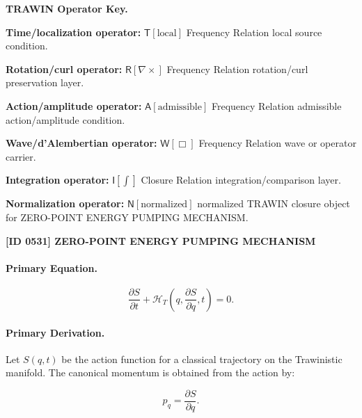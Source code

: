 \par\vspace{0.45\baselineskip}
\noindent\begin{minipage}[t]{\linewidth}
\begingroup
\small
\raggedright
\textbf{TRAWIN Operator Key.}\par
\noindent\textbf{Time/localization operator:} $\mathsf{T}\!\left[\mathrm{local}\right]$ Frequency Relation local source condition.\par
\noindent\textbf{Rotation/curl operator:} $\mathsf{R}\!\left[\nabla\times\right]$ Frequency Relation rotation/curl preservation layer.\par
\noindent\textbf{Action/amplitude operator:} $\mathsf{A}\!\left[\mathrm{admissible}\right]$ Frequency Relation admissible action/amplitude condition.\par
\noindent\textbf{Wave/d'Alembertian operator:} $\mathsf{W}\!\left[\Box\right]$ Frequency Relation wave or operator carrier.\par
\noindent\textbf{Integration operator:} $\mathsf{I}\!\left[\int\right]$ Closure Relation integration/comparison layer.\par
\noindent\textbf{Normalization operator:} $\mathsf{N}\!\left[\mathrm{normalized}\right]$ normalized TRAWIN closure object for ZERO-POINT ENERGY PUMPING MECHANISM.\par
\endgroup
\end{minipage}

\clearpage
\noindent\textbf{[ID 0531] ZERO-POINT ENERGY PUMPING MECHANISM}\par
\vspace{0.35em}
\paragraph{Primary Equation.}
\begin{equation}
\frac{\partial S}{\partial t}
+
\mathcal{H}_T
\left(
q,\frac{\partial S}{\partial q},t
\right)
=
0 .
\end{equation}

\paragraph{Primary Derivation.}
Let $S(q,t)$ be the action function for a classical trajectory on the Trawinistic manifold.  
The canonical momentum is obtained from the action by:

\begin{equation}
p_q=\frac{\partial S}{\partial q}.
\end{equation}


